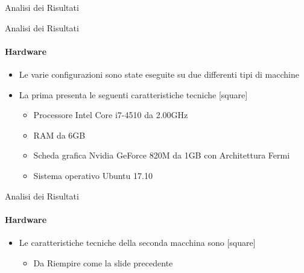 \documentclass[
 ]{beamer}
\begin{document}
\begin{frame}[c]
  \centering
  \bigskip \bigskip    
  \Huge Analisi dei Risultati
\end{frame}

\begin{frame}{Analisi dei Risultati}
    \framesubtitle{Hardware}
    \smallskip
    \begin{itemize} [<+->]
        \setlength\itemsep{2em}
        \item \large Le varie configurazioni sono state eseguite su due differenti tipi di macchine
        \item \large La prima presenta le seguenti caratteristiche tecniche       
        \bigskip
        [square] 
        \begin{itemize} [<+->] 
        \setlength\itemsep{2.5em}
            \item \large Processore Intel Core i7-4510 da 2.00GHz
            \item \large RAM da 6GB
            \item \large Scheda grafica Nvidia GeForce 820M da 1GB con Architettura Fermi
            \item \large Sistema operativo Ubuntu 17.10                    
        \end{itemize}        
    \end{itemize}     
\end{frame}

\begin{frame}{Analisi dei Risultati}
    \framesubtitle{Hardware}
    \smallskip
    \begin{itemize} [<+->]
        \setlength\itemsep{2em}
        \item \large Le caratteristiche tecniche della seconda macchina sono            
        \bigskip
        [square] 
        \begin{itemize} [<+->] 
        \setlength\itemsep{2.5em}
            \item \large Da Riempire come la slide precedente                   
        \end{itemize}        
    \end{itemize}     
\end{frame}
\end{document}
